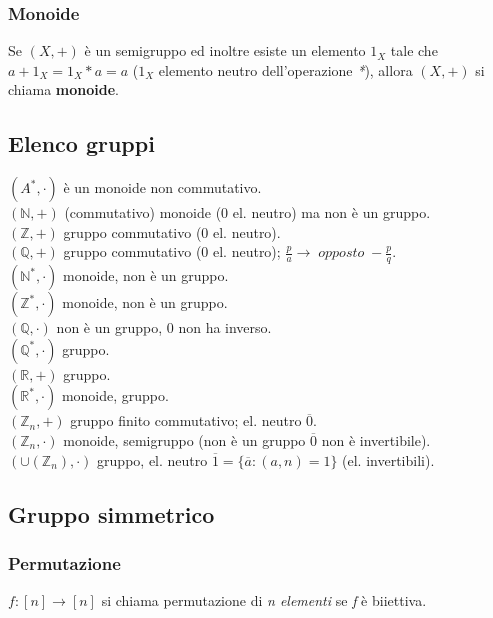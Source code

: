\subsubsection{Monoide}
Se \((X,+)\) è un semigruppo ed inoltre esiste un elemento \(1_X\) tale che \(a+1_X=1_X*a=a\) (\(1_X\) elemento neutro dell'operazione \textit{*}), allora \((X,+)\) si chiama \textbf{monoide}.

\subsection{Elenco gruppi}
\textbf{\((A^*, \cdot )\)} è un monoide non commutativo.
\\\textbf{\((\mathbb{N}, +) \)} (commutativo) monoide (0 el. neutro) ma non è un gruppo.
\\\textbf{\( (\mathbb{Z}, +)\)} gruppo commutativo (0 el. neutro).
\\\textbf{\((\mathbb{Q}, +) \)} gruppo commutativo (0 el. neutro); \(\frac{p}{a}\rightarrow\;opposto\;-\frac{p}{q}\).
\\\textbf{\((\mathbb{N}^*, \cdot)\)} monoide, non è un gruppo.
\\\textbf{\((\mathbb{Z}^*, \cdot)\)} monoide, non è un gruppo.
\\\textbf{\((\mathbb{Q}, \cdot)\)} non è un gruppo, 0 non ha inverso.
\\\textbf{\((\mathbb{Q}^*,\cdot)\)} gruppo.
\\\textbf{\((\mathbb{R}, +)\)} gruppo.
\\\textbf{\((\mathbb{R}^*, \cdot)\)} monoide, gruppo.
\\\textbf{\((\mathbb{Z}_n, +)\)} gruppo finito commutativo; el. neutro \(\overline{0}\).
\\\textbf{\((\mathbb{Z}_n,\cdot)\)} monoide, semigruppo (non è un gruppo \(\overline{0}\) non è invertibile).
\\\textbf{\((\cup (\mathbb{Z}_n),\cdot) \)} gruppo, el. neutro \(\overline{1}=\{\overline{a}: (a,n)=1\}\) (el. invertibili).

\subsection{Gruppo simmetrico}

\subsubsection{Permutazione}
\(f:[n]\rightarrow [n]\) si chiama permutazione di \textit{n elementi} se \textit{f} è biiettiva.

